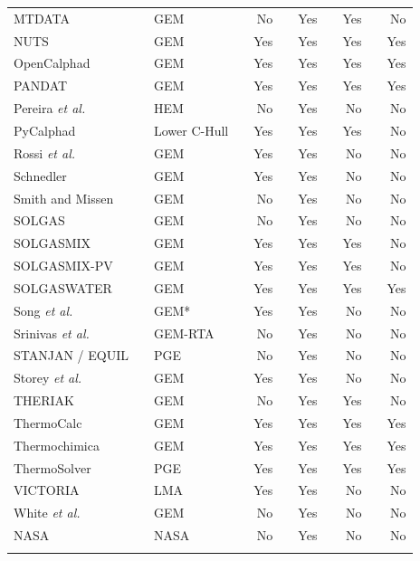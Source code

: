 {\begin{longtable}{@{}lclcrcrcrcr@{}}
		MTDATA  \cite{Davies02} && {GEM} && No && Yes && Yes && No\\
		NUTS \cite{Loukusa:2014aa} && {GEM} && Yes && Yes && Yes && Yes\\
		OpenCalphad \cite{Sundman:2015aa} && {GEM} && Yes && Yes && Yes && Yes\\
		PANDAT \cite{Cao09} && {GEM} && Yes && Yes && Yes && Yes\\
		Pereira \textit{et al.} \cite{PEREIRA20101} && {HEM} && No && Yes && No && No\\
		PyCalphad \cite{Otis:2017aa} && {Lower C-Hull} && Yes && Yes && Yes && No\\
		Rossi \textit{et al.} \cite{ROSSI20111226} && GEM && Yes && Yes && No && No\\
		Schnedler \cite{SCHNEDLER1984265} && GEM && Yes && Yes && No && No\\
		Smith and Missen \cite{Smith:1988aa} && GEM && No && Yes && No && No\\
		SOLGAS \cite{Eriksson71} && GEM && No && Yes && No && No\\
		SOLGASMIX \cite{Eriksson:1975aa} && GEM && Yes && Yes && Yes && No\\
		SOLGASMIX-PV \cite{Besmann:1977aa} && GEM && Yes && Yes && Yes && No\\
		SOLGASWATER \cite{ERIKSSON1979375} && GEM && Yes && Yes && Yes && Yes\\
		Song \textit{et al.} \cite{SONG19912513} && GEM* && Yes && Yes && No && No\\
		Srinivas \textit{et al.} \cite{Srinivas06} && GEM-RTA && No && Yes && No && No\\
		STANJAN / EQUIL \cite{Reynolds86} && PGE && No && Yes && No && No\\
		Storey \textit{et al.} \cite{Storey:1964aa} && GEM && Yes && Yes && No && No\\
		THERIAK \cite{DECAPITANI19872639} && GEM && No && Yes && Yes && No\\
		ThermoCalc \cite{ANDERSSON2002273} && GEM && Yes && Yes && Yes && Yes\\
		Thermochimica \cite{Piro13} && GEM && Yes && Yes && Yes && Yes\\
		ThermoSolver \cite{Piro11b} && PGE && Yes && Yes && Yes && Yes\\
		VICTORIA \cite{Heams:1992aa} && LMA && Yes && Yes && No && No\\
		White \textit{et al.} \cite{White58a} && GEM && No && Yes && No && No\\
		NASA \cite{Zeleznik:1968aa} && NASA && No && Yes && No && No\\
		\bottomrule\label{tab:gemreview}
	\end{longtable}
}
	
